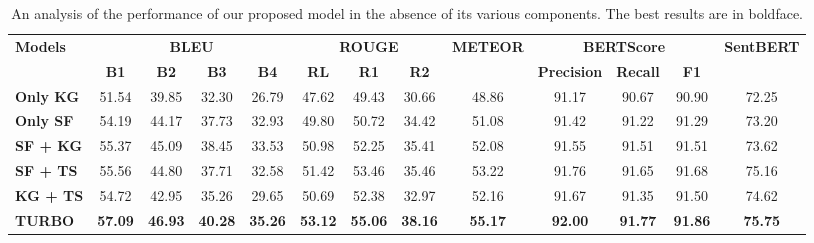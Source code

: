 \begin{table*}[t]
    \small
  \centering
  \begin{tabular}{lcccccccccccc}
    \hline
        \toprule
     \multirow{2}{*}{\bf Models} & \multicolumn{4}{c}{\bf BLEU} & \multicolumn{3}{c}{\bf ROUGE} &  \multirow{2}{*}{\bf METEOR} & \multicolumn{3}{c}{\bf BERTScore} & \multirow{2}{*}{\bf SentBERT} \\ \cmidrule{2-5} \cmidrule{6-8} \cmidrule{10-12}
     
    & \bf B1 & \bf B2 & \bf B3 & \bf B4 & \bf RL & \bf R1 & \bf R2 & & \bf Precision & \bf Recall & \bf F1 & \\
    \midrule

    \textbf{Only KG} & 51.54 & 39.85 & 32.30 & 26.79 & 47.62 & 49.43 & 30.66 & 48.86 & 91.17 &	90.67 &	90.90 & 72.25\\
    \textbf{Only SF} & 54.19 & 44.17 & 37.73 & 32.93 & 49.80 & 50.72 & 34.42 & 51.08 & 91.42 & 91.22 & 91.29 & 73.20\\
    \textbf{SF + KG} & 55.37 & 45.09 & 38.45 & 33.53 & 50.98 & 52.25 & 35.41 & 52.08 & 91.55 &	91.51 &	91.51 & 73.62\\
    \textbf{SF + TS} & 55.56 & 44.80 & 37.71 & 32.58 & 51.42 & 53.46 & 35.46 & 53.22 & 91.76 &	91.65 &	91.68 & 75.16\\
    \textbf{KG + TS} & 54.72 & 42.95 & 35.26 & 29.65 & 50.69 & 52.38 & 32.97 & 52.16 & 91.67 & 91.35 & 91.50 & 74.62\\
    \midrule
    \textbf{TURBO} & \textbf{57.09} & \textbf{46.93} & \textbf{40.28} & \textbf{35.26} & \textbf{53.12} & \textbf{55.06} & \textbf{38.16} & \textbf{55.17} & \textbf{92.00} & \textbf{91.77} & \textbf{91.86} & \textbf{75.75}\\
    \bottomrule
  \end{tabular}
  \caption{An analysis of the performance of our proposed model in the absence of its various components. The best results are in boldface.}
  \label{table:ablation}
\end{table*}